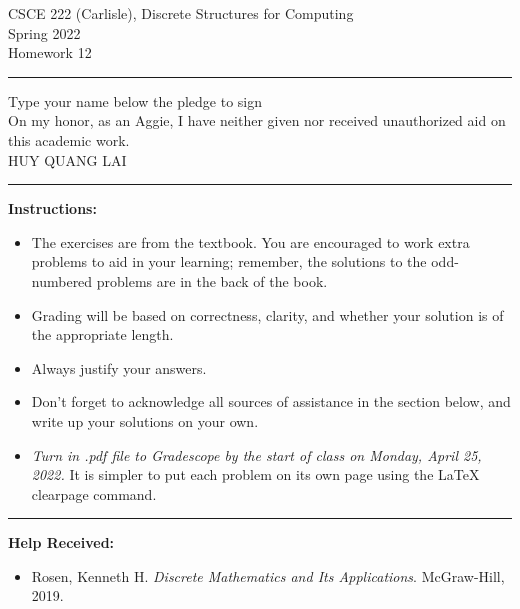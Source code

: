 \documentclass[12pt]{article}  %
\begin{document}
\begin{center}         %
{\large                %
CSCE 222 (Carlisle), Discrete Structures for Computing \\  %
Spring 2022 \\
Homework 12}
\end{center}
\rule{6in}{.1pt}       %
\begin{center}
{\large
Type your name below the pledge to sign\\
On my honor, as an Aggie, I have neither given nor received unauthorized aid on this academic work.\\
HUY QUANG LAI}
\end{center}


\rule{6in}{.1pt}       %
                    
\noindent              %
{\bf Instructions:}    %

\begin{itemize}        %
\item The exercises are from the textbook.  You are encouraged to work
      extra problems to aid in your learning; remember, the solutions to 
      the odd-numbered problems are in the back of the book.
\item Grading will be based on correctness, clarity, and whether your
      solution is of the appropriate length.
\item Always justify your answers.
\item Don't forget to acknowledge all sources of assistance in the section below, and write up your solutions on your own.
\item {\em Turn in .pdf file to Gradescope by the start of class on Monday, April 25, 2022.}  It is simpler to put each problem on its own page using the LaTeX clearpage command.
\end{itemize}


\rule{6in}{.1pt}       %

{\bf Help Received:}    %
\begin{itemize}
\item Rosen, Kenneth H. \textit{Discrete Mathematics and Its Applications}. McGraw-Hill, 2019.
\end{itemize}
\end{document}
